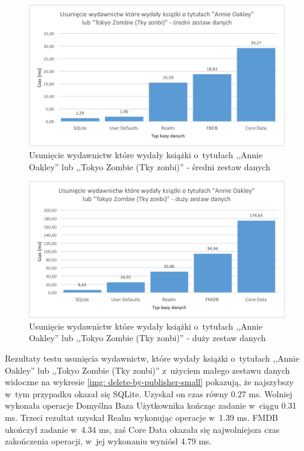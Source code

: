 \begin{figure}[H]
    \centering\includegraphics[width=\linewidth]{img/delete_data/delete_by_publisher/delete_by_publisher_medium_test.png}
    \caption{Usunięcie wydawnictw które wydały książki o~tytułach ,,Annie Oakley'' lub ,,Tokyo Zombie (Tky zonbi)'' - średni zestaw danych}
    \label{img: delete-by-publisher-medium}
\end{figure}

\begin{figure}[H]
    \centering\includegraphics[width=\linewidth]{img/delete_data/delete_by_publisher/delete_by_publisher_big_test.png}
    \caption{Usunięcie wydawnictw które wydały książki o~tytułach ,,Annie Oakley'' lub ,,Tokyo Zombie (Tky zonbi)'' - duży zestaw danych}
    \label{img: delete-by-publisher-big}
\end{figure}

Rezultaty testu usunięcia wydawnictw, które wydały książki o~tytułach ,,Annie Oakley'' lub ,,Tokyo Zombie (Tky zonbi)'' z~użyciem małego zestawu danych widoczne na wykresie \ref{img: delete-by-publisher-small} pokazują, że najszybszy w~tym przypadku okazał się SQLite. Uzyskał on czas równy 0.27 ms. Wolniej wykonała operacje Domyślna Baza Użytkownika kończąc zadanie w~ciągu 0.31 ms. Trzeci rezultat uzyskał Realm wykonując operacje w~1.39 ms. FMDB ukończył zadanie w~4.34 ms, zaś Core Data okazała się najwolniejsza czas zakończenia operacji, w~jej wykonaniu wyniósł 4.79 ms. 

